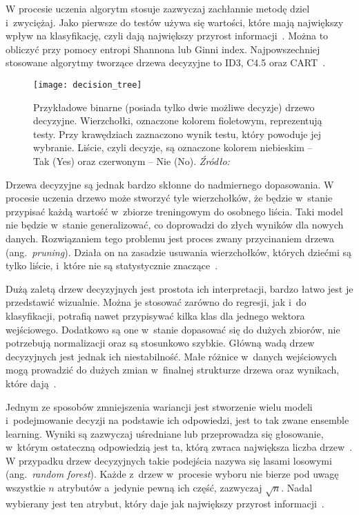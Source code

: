 W procesie uczenia algorytm stosuje zazwyczaj zachłannie metodę dziel i~zwyciężaj.
Jako pierwsze do testów używa się wartości, które mają największy wpływ na klasyfikację, czyli dają największy przyrost informacji~\cite{Russell2020}.
Można to obliczyć przy pomocy entropi Shannona lub Ginni index.
Najpowszechniej stosowane algorytmy tworzące drzewa decyzyjne to ID3, C4.5 oraz CART~\cite{Russell2020, Murphy2022}.

\begin{figure}[h]
    \centering
    \texttt{[image: decision\_tree]}
    \caption{Przykładowe binarne (posiada tylko dwie możliwe decyzje) drzewo decyzyjne. Wierzchołki, oznaczone kolorem fioletowym, reprezentują testy. Przy krawędziach zaznaczono wynik testu, który powoduje jej wybranie. Liście, czyli decyzje, są oznaczone kolorem niebieskim -- Tak (Yes) oraz czerwonym -- Nie (No). \textit{Źródło:~\cite{Russell2020}}}
    \label{fig:decision-tree}
\end{figure}

Drzewa decyzyjne są jednak bardzo skłonne do nadmiernego dopasowania.
W procesie uczenia drzewo może stworzyć tyle wierzchołków, że będzie w~stanie przypisać każdą wartość w~zbiorze treningowym do osobnego liścia.
Taki model nie będzie w~stanie generalizować, co doprowadzi do złych wyników dla nowych danych.
Rozwiązaniem tego problemu jest proces zwany przycinaniem drzewa (ang.~\textit{pruning}).
Działa on na zasadzie usuwania wierzchołków, których dziećmi są tylko liście, i~które nie są statystycznie znaczące~\cite{Russell2020}.

Dużą zaletą drzew decyzyjnych jest prostota ich interpretacji, bardzo łatwo jest je przedstawić wizualnie.
Można je stosować zarówno do regresji, jak i~do klasyfikacji, potrafią nawet przypisywać kilka klas dla jednego wektora wejściowego.
Dodatkowo są one w~stanie dopasować się do dużych zbiorów, nie potrzebują normalizacji oraz są stosunkowo szybkie.
Główną wadą drzew decyzyjnych jest jednak ich niestabilność.
Małe różnice w~danych wejściowych mogą prowadzić do dużych zmian w~finalnej strukturze drzewa oraz wynikach, które dają~\cite{Murphy2022}.

Jednym ze sposobów zmniejszenia wariancji jest stworzenie wielu modeli i~podejmowanie decyzji na podstawie ich odpowiedzi, jest to tak zwane ensemble learning.
Wyniki są zazwyczaj uśredniane lub przeprowadza się głosowanie, w~którym ostateczną odpowiedzią jest ta, którą zwraca największa liczba drzew~\cite{Russell2020}.
W przypadku drzew decyzyjnych takie podejścia nazywa się lasami losowymi (ang.~\textit{random forest}).
Każde z~drzew w~procesie wyboru nie bierze pod uwagę wszystkie \(n\) atrybutów a~jedynie pewną ich część, zazwyczaj \(\sqrt{n}\).
Nadal wybierany jest ten atrybut, który daje jak największy przyrost informacji~\cite{Russell2020}.

